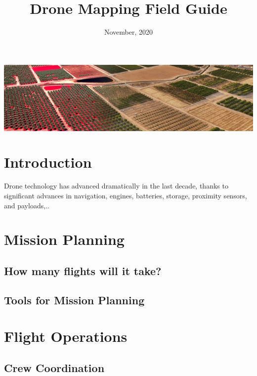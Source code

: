 \documentclass[
]{book}
\title{Drone Mapping Field Guide}
\author{}
\date{\vspace{-2.5em}November, 2020}
\begin{document}
\maketitle

{
\setcounter{tocdepth}{1}
\tableofcontents
}
\includegraphics{images/fld-gde-banner_640x170.jpg}

\hypertarget{introduction}{%
\chapter{Introduction}\label{introduction}}

Drone technology has advanced dramatically in the last decade, thanks to significant advances in navigation, engines, batteries, storage, proximity sensors, and payloads,..

\hypertarget{mission-planning}{%
\chapter{Mission Planning}\label{mission-planning}}

\hypertarget{how-many-flights-will-it-take}{%
\section{How many flights will it take?}\label{how-many-flights-will-it-take}}

\hypertarget{tools-for-mission-planning}{%
\section{Tools for Mission Planning}\label{tools-for-mission-planning}}

\hypertarget{flight-operations}{%
\chapter{Flight Operations}\label{flight-operations}}

\hypertarget{crew-coordination}{%
\section{Crew Coordination}\label{crew-coordination}}
\end{document}

